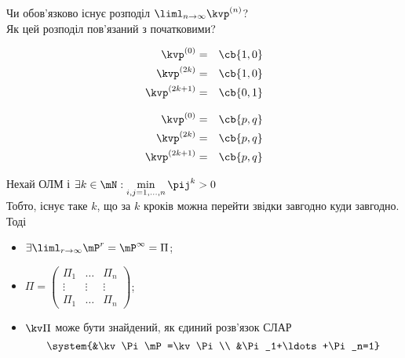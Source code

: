 Чи обов’язково існує розподіл $\liml_{n\to\infty} \kvp^{(n)}$?\\
Як цей розподіл пов’язаний з початковими?\\
\begin{exs}
\begin{eqnarray*}
\kvp^{(0)} &=& \cb{1,0}\\
\kvp^{(2k)} &=& \cb{1,0}\\
\kvp^{(2k+1)} &=& \cb{0,1}
\end{eqnarray*}
\end{exs}
\begin{exs}
\begin{eqnarray}
\kvp^{(0)} &=& \cb{p,q}\\
\kvp^{(2k)} &=& \cb{p,q}\\
\kvp^{(2k+1)} &=& \cb{p,q}
\end{eqnarray}	
\end{exs}
\begin{teor}
Нехай ОЛМ і $\exists k\in\mN: \min\limits_{i,j=1,\ldots,n} \pij^{k}>0$\\
Тобто, існує таке $k$, що за $k$ кроків можна перейти звідки завгодно куди завгодно.\\
Тоді 
\begin{itemize}
\item $\exists \liml_{r\to\infty} \mP^{r} = \mP^{\infty} = \Pi$;
\item $\Pi = \begin{pmatrix}
\Pi_1 & \ldots & \Pi_n \\
\vdots & \vdots & \vdots \\
\Pi_1 & \ldots &\Pi_n
\end{pmatrix}$;
\item $\kv\Pi$ може бути знайдений, як єдиний розв’язок СЛАР
\begin{equation*}
\system{&\kv\Pi\mP=\kv\Pi \\ &\Pi_1+\ldots+\Pi_n=1}
\end{equation*}
\end{itemize}
\end{teor}
